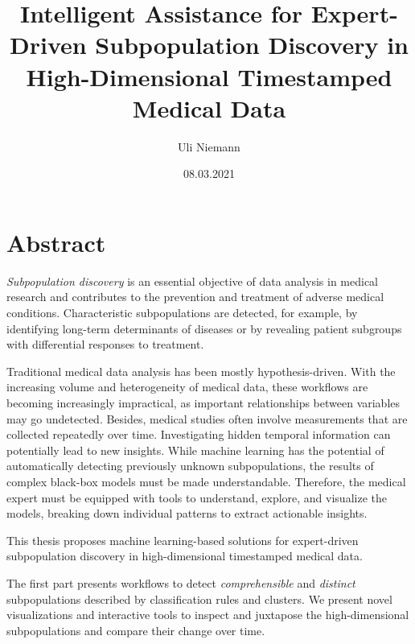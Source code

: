 \documentclass[
  oneside]{book}
\title{Intelligent Assistance for Expert-Driven Subpopulation Discovery in High-Dimensional Timestamped Medical Data}
\author{Uli Niemann}
\date{08.03.2021}
\begin{document}
\maketitle

{
\setcounter{tocdepth}{1}
\tableofcontents
}

\hypertarget{abstract}{%
\section*{Abstract}\label{abstract}}

\emph{Subpopulation discovery} is an essential objective of data analysis in medical research and contributes to the prevention and treatment of adverse medical conditions.
Characteristic subpopulations are detected, for example, by identifying long-term determinants of diseases or by revealing patient subgroups with differential responses to treatment.

Traditional medical data analysis has been mostly hypothesis-driven.
With the increasing volume and heterogeneity of medical data, these workflows are becoming increasingly impractical, as important relationships between variables may go undetected.
Besides, medical studies often involve measurements that are collected repeatedly over time.
Investigating hidden temporal information can potentially lead to new insights.
While machine learning has the potential of automatically detecting previously unknown subpopulations, the results of complex black-box models must be made understandable.
Therefore, the medical expert must be equipped with tools to understand, explore, and visualize the models, breaking down individual patterns to extract actionable insights.

This thesis proposes machine learning-based solutions for expert-driven subpopulation discovery in high-dimensional timestamped medical data.

The first part presents workflows to detect \emph{comprehensible} and \emph{distinct} subpopulations described by classification rules and clusters.
We present novel visualizations and interactive tools to inspect and juxtapose the high-dimensional subpopulations and compare their change over time.
\end{document}
